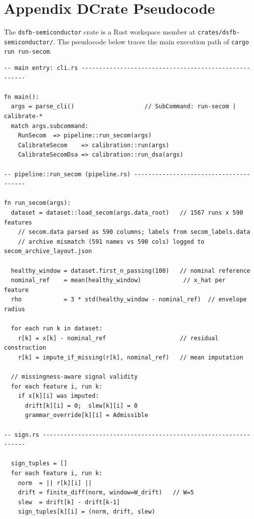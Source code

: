 \documentclass[11pt,letterpaper]{article}
\theoremstyle{scresult}
\begin{document}
\clearpage

\section*{Appendix D\quad Crate Pseudocode}
\label{app:pseudocode}

\noindent The \texttt{dsfb-semiconductor} crate is a Rust workspace member
at \texttt{crates/dsfb-semiconductor/}.  The pseudocode below traces the
main execution path of \texttt{cargo run \textellipsis{} run-secom}.
\footnotesize
\begin{verbatim}
-- main entry: cli.rs ------------------------------------------------------

fn main():
  args = parse_cli()                    // SubCommand: run-secom | calibrate-*
  match args.subcommand:
    RunSecom  => pipeline::run_secom(args)
    CalibrateSecom    => calibration::run(args)
    CalibrateSecomDsa => calibration::run_dsa(args)

-- pipeline::run_secom (pipeline.rs) ---------------------------------------

fn run_secom(args):
  dataset = dataset::load_secom(args.data_root)   // 1567 runs x 590 features
    // secom.data parsed as 590 columns; labels from secom_labels.data
    // archive mismatch (591 names vs 590 cols) logged to secom_archive_layout.json

  healthy_window = dataset.first_n_passing(100)   // nominal reference
  nominal_ref    = mean(healthy_window)            // x_hat per feature
  rho            = 3 * std(healthy_window - nominal_ref)  // envelope radius

  for each run k in dataset:
    r[k] = x[k] - nominal_ref                     // residual construction
    r[k] = impute_if_missing(r[k], nominal_ref)   // mean imputation

  // missingness-aware signal validity
  for each feature i, run k:
    if x[k][i] was imputed:
      drift[k][i] = 0;  slew[k][i] = 0
      grammar_override[k][i] = Admissible

-- sign.rs -----------------------------------------------------------------

  sign_tuples = []
  for each feature i, run k:
    norm  = || r[k][i] ||
    drift = finite_diff(norm, window=W_drift)   // W=5
    slew  = drift[k] - drift[k-1]
    sign_tuples[k][i] = (norm, drift, slew)


\end{verbatim}
\end{document}
